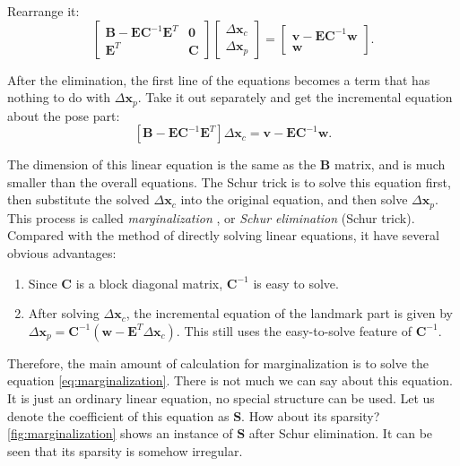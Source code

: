 Rearrange it: 
\begin{equation}
	\left[ \begin{matrix}
		\mathbf{B} - \mathbf{E}\mathbf{C}^{-1}\mathbf{E}^T	& 	\mathbf{0} \\
		\mathbf{E}^T							& 	\mathbf{C}
	\end{matrix} \right]
	\left[ \begin{array}{l}
		\Delta \mathbf{x}_c \\
		\Delta \mathbf{x}_p 
	\end{array} \right] = 
	\left[\begin{array}{l}
		\mathbf{v} - \mathbf{E}\mathbf{C}^{-1}\mathbf{w}  \\
		\mathbf{w}
	\end{array}\right].
\end{equation}

After the elimination, the first line of the equations becomes a term that has nothing to do with $\Delta \mathbf{x}_p$. Take it out separately and get the incremental equation about the pose part:
\begin{equation}\label{eq:marginalization}
	\left[ 
	\mathbf{B} - \mathbf{E}\mathbf{C}^{-1}\mathbf{E}^T
	\right]
	\Delta \mathbf{x}_c  = 
	\mathbf{v} - \mathbf{E}\mathbf{C}^{-1}\mathbf{w} .
\end{equation}

The dimension of this linear equation is the same as the $\mathbf{B}$ matrix, and is much smaller than the overall equations. The Schur trick is to solve this equation first, then substitute the solved $\Delta \mathbf{x}_c$ into the original equation, and then solve $\Delta \mathbf{x}_p$. This process is called \textit{marginalization} {\cite{Sibley2010}}, or \textit{Schur elimination} (Schur trick). Compared with the method of directly solving linear equations, it have several obvious advantages:

\begin{enumerate}
	\item Since $\mathbf{C}$ is a block diagonal matrix, $\mathbf{C}^{-1}$ is easy to solve.
	\item After solving $\Delta \mathbf{x}_c$, the incremental equation of the landmark part is given by $\Delta \mathbf{x}_p = \mathbf{C}^{-1} (\mathbf{w}-\mathbf {E}^T \Delta \mathbf{x}_c)$. This still uses the easy-to-solve feature of $\mathbf{C}^{-1}$.
\end{enumerate}

Therefore, the main amount of calculation for marginalization is to solve the equation \eqref{eq:marginalization}. There is not much we can say about this equation. It is just an ordinary linear equation, no special structure can be used. Let us denote the coefficient of this equation as $\mathbf{S}$. How about its sparsity? \autoref{fig:marginalization} shows an instance of $\mathbf{S}$ after Schur elimination. It can be seen that its sparsity is somehow irregular.

